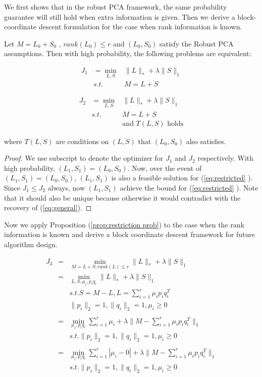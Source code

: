 We first shows that in the robust PCA framework, the same probability
guarantee will still hold when extra information is given. Then we
derive a block-coordinate descent formulation for the case when rank
information is known.
\begin{prop}
\label{prop:restriction prob}Let $M=L_{0}+S_{0}$ , $rank(L_{0})\le r$ and $(L_0,S_0)$
satisfy the Robust PCA assumptions. Then with high probability, the
following problems are equivalent:

\begin{eqnarray}
J_{1} & =\min_{L,S} & \|L\|_{*}+\lambda\|S\|_{1}\label{eq:general}\\
 & s.t. & M=L+S\nonumber
\end{eqnarray}

\begin{eqnarray}
J_{2} & =\min_{L,S} & \|L\|_{*}+\lambda\|S\|_{1}\label{eq:restricted}\\
 & s.t. & M=L+S\nonumber \\
 &  & \text{and }T(L,S)\text{ holds}\nonumber
\end{eqnarray}


where $T(L,S)$ are conditions on $(L,S)$ that $(L_{0},S_{0})$ also
satisfies.\end{prop}
\begin{proof}
We use subscript to denote the optimizer for $J_{1}$ and $J_{2}$ respectively.
With high probability, $(L_{1},S_{1})=(L_{0},S_{0})$. Now, over the
event of $(L_{1},S_{1})=(L_{0},S_{0})$, $(L_{1},S_{1})$ is also
a feasible solution for (\ref{eq:restricted} ). Since $J_{1}\le J_{2}$ always,
now $(L_{1},S_{1})$ achieve the bound for (\ref{eq:restricted} ).
Note that it should also be unique because otherwise it would contradict with
the recovery of (\ref{eq:general}).
\end{proof}
Now we apply Proposition (\ref{prop:restriction prob}) to the case
when the rank information is known and derive a block coordinate descent
framework for future algorithm design.

\begin{eqnarray}
J_{3} & = & \min_{M=L+S,rank(L)\le r}\|L\|_{*}+\lambda\|S\|_{1}\nonumber \\
 & = & \min_{L,S,\mu_{i},p_{i}q_{i}}\|L\|_{*}+\lambda\|S\|_{1}\nonumber \\
 && s.t. S=M-L,L=\sum_{i=1}^{r}\mu_{i}p_{i}q_{i}^{T}\nonumber \\
 &  & \|p_{i}\|_{2}=1,\|q_{i}\|_{2}=1,\mu_{i}\ge0\nonumber \\
\nonumber \\
 & = & \min_{\mu_{i},p_{i}q_{i}}\sum_{i=1}^{r}\mu_{i}+\lambda\|M-\sum_{i=1}^{r}\mu_{i}p_{i}q_{i}^{T}\|_{1}\nonumber \\
 && s.t. \|p_{i}\|_{2}=1,\|q_{i}\|_{2}=1,\mu_{i}\ge0\nonumber \\
\nonumber \\
 & = & \min_{\mu_{i},p_{i}q_{i}}\sum_{i=1}^{r}|\mu_{i}-0|+\lambda\|M-\sum_{i=1}^{r}\mu_{i}p_{i}q_{i}^{T}\|_{1}\label{eq:rank form}\\
 && s.t. \|p_{i}\|_{2}=1,\|q_{i}\|_{2}=1,\mu_{i}\ge0\nonumber
\end{eqnarray}


